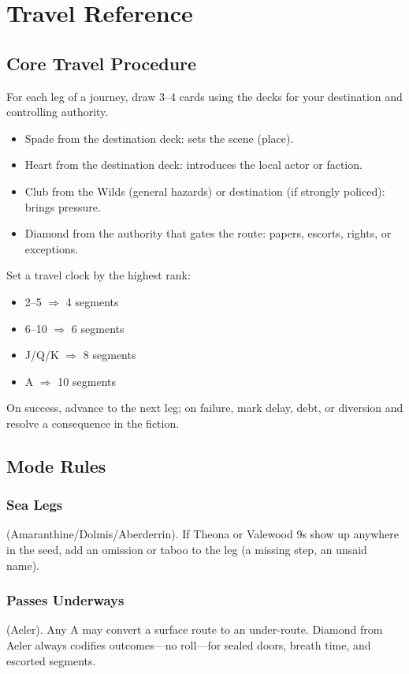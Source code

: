 \documentclass[11pt,letterpaper,twoside]{book}
\begin{document}
\chapter{Travel Reference}

\section{Core Travel Procedure}

For each leg of a journey, draw 3--4 cards using the decks for your destination and controlling authority.

\begin{itemize}
\item Spade from the destination deck: sets the scene (place).
\item Heart from the destination deck: introduces the local actor or faction.
\item Club from the Wilds (general hazards) or destination (if strongly policed): brings pressure.
\item Diamond from the authority that gates the route: papers, escorts, rights, or exceptions.
\end{itemize}

Set a travel clock by the highest rank:
\begin{itemize}
\item 2--5 $\Rightarrow$ 4 segments
\item 6--10 $\Rightarrow$ 6 segments
\item J/Q/K $\Rightarrow$ 8 segments
\item A $\Rightarrow$ 10 segments
\end{itemize}

On success, advance to the next leg; on failure, mark delay, debt, or diversion and resolve a consequence in the fiction.

\section{Mode Rules}

\subsection{Sea Legs}
(Amaranthine/Dolmis/Aberderrin). If Theona or Valewood 9s show up anywhere in the seed, add an omission or taboo to the leg (a missing step, an unsaid name).

\subsection{Passes Underways}
(Aeler). Any A may convert a surface route to an under-route. Diamond from Aeler always codifies outcomes---no roll---for sealed doors, breath time, and escorted segments.
\end{document}
